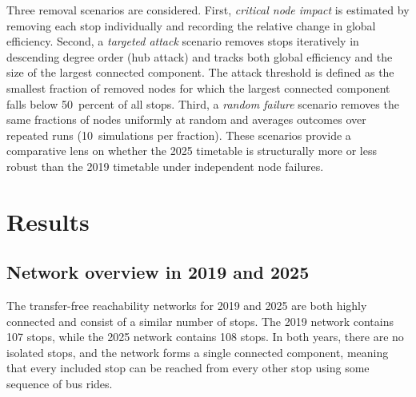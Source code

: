 \documentclass[12pt,a4paper,oneside]{report}
\begin{document}
Three removal scenarios are considered.
First, \emph{critical node impact} is estimated by removing each stop individually and recording the relative change in global efficiency.
Second, a \emph{targeted attack} scenario removes stops iteratively in descending degree order (hub attack) and tracks both global efficiency and the size of the largest connected component.
The attack threshold is defined as the smallest fraction of removed nodes for which the largest connected component falls below 50~percent of all stops.
Third, a \emph{random failure} scenario removes the same fractions of nodes uniformly at random and averages outcomes over repeated runs (10~simulations per fraction).
These scenarios provide a comparative lens on whether the 2025 timetable is structurally more or less robust than the 2019 timetable under independent node failures.

\chapter{Results}\label{ch:results}

\section{Network overview in 2019 and 2025}\label{sec:overview}

The transfer-free reachability networks for 2019 and 2025 are both highly connected and consist of a similar number of stops.
The 2019 network contains 107 stops, while the 2025 network contains 108 stops.
In both years, there are no isolated stops, and the network forms a single connected component, meaning that every included stop can be reached from every other stop using some sequence of bus rides.
\end{document}
